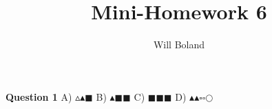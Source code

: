 \documentclass{article}
\begin{document}
\title{Mini-Homework 6}
\author{Will Boland}
\maketitle

\textbf{Question 1}\newline
A)	$\vartriangle$$\blacktriangle$$\blacksquare$\newline
B)	$\blacktriangle$$\blacksquare$$\blacksquare$\newline
C)	$\blacksquare$$\blacksquare$$\blacksquare$\newline
D)	$\blacktriangle$$\blacktriangle$$\square$$\square$$\mathbb{\bigcirc}$

\enddocument
\end{document}

